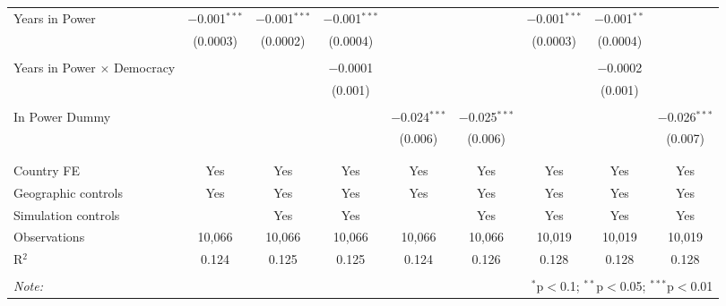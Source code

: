\documentclass[11pt, oneside]{article}   	%
\begin{document}
\begin{spacing}{1.3}
\begin{table}[!t]
{\begin{tabular}{@{\extracolsep{5pt}}lcccccccc}
      Years in Power & $-$0.001$^{***}$ & $-$0.001$^{***}$ & $-$0.001$^{***}$ &  &  & $-$0.001$^{***}$ & $-$0.001$^{**}$ &  \\
       & (0.0003) & (0.0002) & (0.0004) &  &  & (0.0003) & (0.0004) &  \\
       & & & & & & & & \\
      Years in Power $\times$ Democracy &  &  & $-$0.0001 &  &  &  & $-$0.0002 &  \\
       &  &  & (0.001) &  &  &  & (0.001) &  \\
       & & & & & & & & \\
      In Power Dummy &  &  &  & $-$0.024$^{***}$ & $-$0.025$^{***}$ &  &  & $-$0.026$^{***}$ \\
       &  &  &  & (0.006) & (0.006) &  &  & (0.007) \\
       & & & & & & & & \\
\hline \\[-1.8ex]
     Country FE & Yes & Yes & Yes & Yes & Yes & Yes & Yes & Yes \\
     Geographic controls & Yes & Yes & Yes & Yes & Yes & Yes & Yes & Yes \\
     Simulation controls &  & Yes & Yes &  & Yes & Yes & Yes & Yes \\
     Observations & 10,066 & 10,066 & 10,066 & 10,066 & 10,066 & 10,019 & 10,019 & 10,019 \\
     R$^{2}$ & 0.124 & 0.125 & 0.125 & 0.124 & 0.126 & 0.128 & 0.128 & 0.128 \\
     \hline
     \hline \\[-1.8ex]
     \textit{Note:}  & \multicolumn{8}{r}{$^{*}$p$<$0.1; $^{**}$p$<$0.05; $^{***}$p$<$0.01} \\
     \end{tabular}

    }


\end{table}
\end{spacing}
\end{document}

